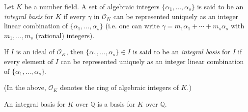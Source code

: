 \documentclass[12pt]{article}
\begin{document}
Let $K$ be a number field.  A set of algebraic integers
$\{\alpha_1,\ldots,\alpha_s\}$ is said to be an {\em integral basis} for $K$
if every $\gamma$ in $\mathcal{O}_K$ can be represented uniquely 
as an integer linear combination of $\{\alpha_1,\ldots,\alpha_s\}$ (i.e. one can write $\gamma = m_1 \alpha_1 + \cdots + m_s \alpha_s$ with $m_1,\ldots,m_s$
(rational) integers).

If $I$ is an ideal of $\mathcal{O}_K$, then $\{\alpha_1,\ldots,\alpha_s\} \in I$ is said to be an {\em integral basis} for $I$ if every element of $I$ can be represented uniquely as an integer linear combination of $\{\alpha_1,\ldots,\alpha_s\}$.

(In the above, $\mathcal{O}_K$ denotes the ring of algebraic integers of $K$.)

An integral basis for $K$ over $\mathbb{Q}$ is a basis for $K$ over $\mathbb{Q}$.
\end{document}
